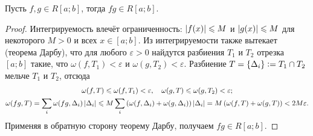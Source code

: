 \begin{theorem}
    Пусть $f, g \in R[a; b]$, тогда $fg \in R[a; b]$.
\end{theorem}

\begin{proof}
    Интегрируемость влечёт ограниченность: $\left\lvert f(x)\right\rvert \leqslant M$ и $\left\lvert g(x)\right\rvert \leqslant M$ для некоторого $M > 0$ и всех $x \in [a; b]$. Из интегрируемости также вытекает (теорема Дарбу), что для любого $\varepsilon > 0$ найдутся разбиения $T_1$ и $T_2$ отрезка $[a; b]$ такие, что $\omega(f, T_1) < \varepsilon$ и $\omega(g, T_2) < \varepsilon$. Разбиение $T = \{\Delta_i\} \vcentcolon = T_1 \cap T_2$ мельче $T_1$ и $T_2$, отсюда
    \begin{gather*}
        \omega(f, T) \leqslant \omega(f, T_1) < \varepsilon,\quad\omega(g, T) \leqslant \omega(g, T_2) < \varepsilon;\\
        \omega(fg, T) = \sum_i\omega(fg, \Delta_i)\left\lvert\Delta_i\right\rvert \leqslant M\sum_i\left(\omega(f, \Delta_i) + \omega(g, \Delta_i)\right)\left\lvert\Delta_i\right\rvert = M\left(\omega(f, T) + \omega(g, T)\right) < 2M\varepsilon.
    \end{gather*}
    Применяя в обратную сторону теорему Дарбу, получаем $fg \in R[a; b]$.
\end{proof}

